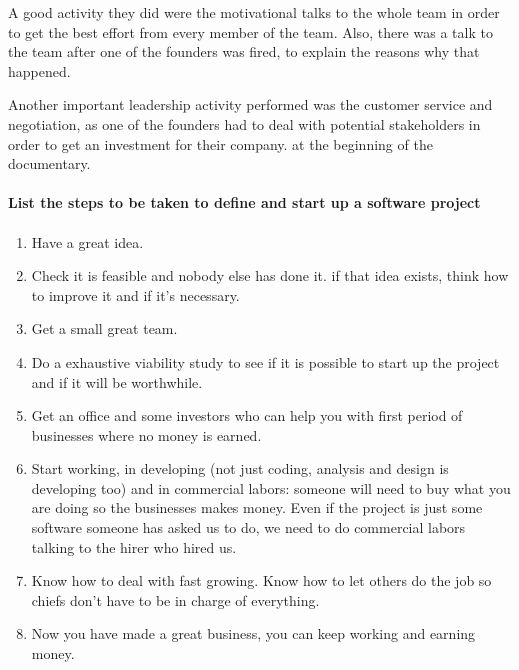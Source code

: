 \documentclass{article}
\begin{document}
A good activity they did were the motivational talks to the whole team in order to get the best effort from every member of the team. Also, there was a talk to the team after one of the founders was fired, to explain the reasons why that happened. 

Another important leadership activity performed was the customer service and negotiation, as one of the founders had to deal with potential stakeholders in order to get an investment for their company. at the beginning of the documentary.


\paragraph{List the steps to be taken to define and start up a software project}
\paragraph{}

\begin{enumerate}
	\item Have a great idea.
	\item Check it is feasible and nobody else has done it.
	\subitem if that idea exists, think how to improve it and if it's necessary.
	\item Get a small great team.
	\item Do a exhaustive viability study to see if it is possible to start up the project and if it will be worthwhile.
	\item Get an office and some investors who can help you with first period of businesses where no money is earned.
	\item Start working, in developing (not just coding, analysis and design is developing too) and in commercial labors: someone will need to buy what you are doing so the businesses makes money. Even if the project is just some software someone has asked us to do, we need to do commercial labors talking to the hirer who hired us.
	\item Know how to deal with fast growing. Know how to let others do the job so chiefs don't have to be in charge of everything.
	\item Now you have made a great business, you can keep working and earning money.
\end{enumerate}
\end{document}
